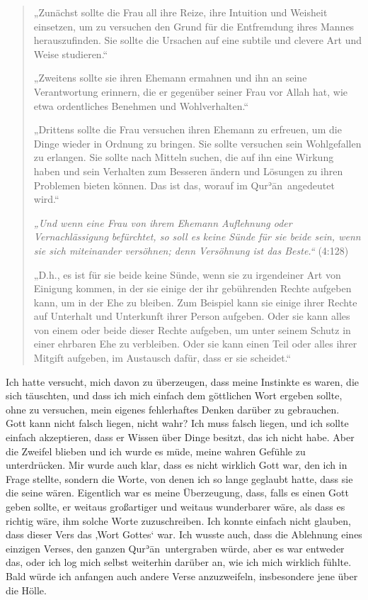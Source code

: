 \documentclass[12pt]{memoir}
\def\´{ʾ} %
\def \Quran{Qur\-\´ān} %
\newcommand{\QRef}[1]{{\color{darkblue}#1}}
\begin{document}
\begin{quote}
„Zunächst sollte die Frau all ihre Reize,
ihre Intuition und Weisheit einsetzen,
um zu versuchen den Grund für die Entfremdung
ihres Mannes herauszufinden.
Sie sollte die Ursachen auf eine subtile
und clevere Art und Weise studieren.“

„Zweitens sollte sie ihren Ehemann ermahnen
und ihn an seine Verantwortung erinnern,
die er gegenüber seiner Frau vor Allah hat,
wie etwa ordentliches Benehmen und Wohlverhalten.“

„Drittens sollte die Frau versuchen ihren Ehemann
zu erfreuen, um die Dinge wieder in Ordnung zu bringen.
Sie sollte versuchen sein Wohlgefallen zu erlangen.
Sie sollte nach Mitteln suchen, die auf ihn eine Wirkung haben
und sein Verhalten zum Besseren ändern
und Lösungen zu ihren Problemen bieten können.
Das ist das, worauf im \Quran\ angedeutet wird.“

\emph{„Und wenn eine Frau von ihrem Ehemann Auflehnung
oder Vernachlässigung befürchtet,
so soll es keine Sünde für sie beide sein,
wenn sie sich miteinander versöhnen;
denn Versöhnung ist das Beste.“} (\QRef{4:128})

„D.h., es ist für sie beide keine Sünde,
wenn sie zu irgendeiner Art von Einigung kommen,
in der sie einige der ihr gebührenden Rechte aufgeben kann,
um in der Ehe zu bleiben.
Zum Beispiel kann sie einige ihrer Rechte
auf Unterhalt und Unterkunft ihrer Person aufgeben.
Oder sie kann alles von einem oder beide dieser Rechte aufgeben,
um unter seinem Schutz in einer ehrbaren Ehe zu verbleiben.
Oder sie kann einen Teil oder alles ihrer Mitgift aufgeben,
im Austausch dafür, dass er sie scheidet.“
\end{quote}

Ich hatte versucht, mich davon zu überzeugen,
dass meine Instinkte es waren, die sich täuschten,
und dass ich mich einfach dem göttlichen Wort ergeben sollte,
ohne zu versuchen, mein eigenes fehlerhaftes Denken darüber zu gebrauchen.
Gott kann nicht falsch liegen, nicht wahr?
Ich muss falsch liegen, und ich sollte einfach akzeptieren,
dass er Wissen über Dinge besitzt, das ich nicht habe.
Aber die Zweifel blieben und ich wurde es müde,
meine wahren Gefühle zu unterdrücken.
Mir wurde auch klar, dass es nicht wirklich Gott war,
den ich in Frage stellte, sondern die Worte,
von denen ich so lange geglaubt hatte, dass sie die seine wären.
Eigentlich war es meine Überzeugung,
dass, falls es einen Gott geben sollte,
er weitaus großartiger und weitaus wunderbarer wäre,
als dass es richtig wäre, ihm solche Worte zuzuschreiben.
Ich konnte einfach nicht glauben, dass dieser Vers das ‚Wort Gottes‘ war.
Ich wusste auch, dass die Ablehnung eines einzigen Verses,
den ganzen \Quran\ untergraben würde, aber es war entweder das,
oder ich log mich selbst weiterhin darüber an, wie ich mich wirklich fühlte.
Bald würde ich anfangen auch andere Verse anzuzweifeln,
insbesondere jene über die Hölle.
\end{document}
